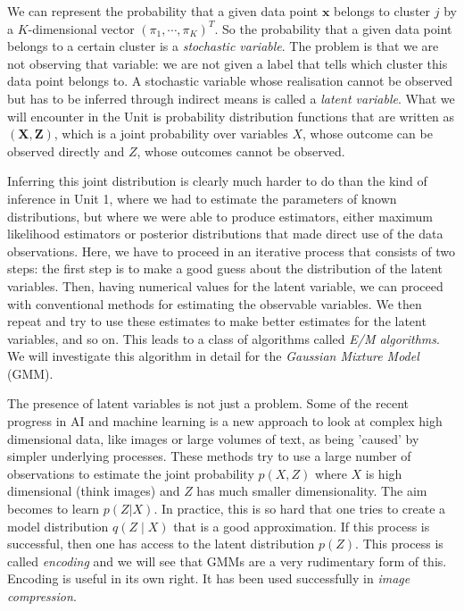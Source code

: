 We can represent the probability that a given data point $\boldsymbol{x}$ belongs to cluster $j$ by a $K$-dimensional
vector $(\pi_1, \cdots, \pi_K)^T$. So the probability that a given data point belongs to a certain cluster is a \emph{stochastic variable}.
The problem is that we are not observing that variable: we are not given a label that tells which cluster this data point belongs to. A stochastic
variable whose realisation cannot be observed but has to be inferred through indirect means is called a \emph{latent variable}. What
we will encounter in the Unit is probability distribution functions that are written as $(\boldsymbol{X}, \boldsymbol{Z})$, which
is a joint probability over variables $X$, whose outcome can be observed directly and $Z$, whose outcomes cannot be observed.

Inferring this joint distribution is clearly much harder to do than the kind of inference in Unit 1, where we had to estimate the parameters
of known distributions, but where we were able to produce estimators, either maximum likelihood estimators or posterior distributions
that made direct use of the data observations. Here, we have to proceed in an iterative process that consists of two steps:
the first step is to make a good guess about the distribution of the latent variables. Then, having numerical values for the latent variable, we
can proceed with conventional methods for estimating the observable variables. We then repeat and try to use these estimates
to make better estimates for the latent variables, and so on. This leads to a class of algorithms called \emph{E/M algorithms}. We will
investigate this algorithm in detail for the \emph{Gaussian Mixture Model} (GMM).

The presence of latent variables is not just a problem. Some of the recent progress in AI and machine learning is a new approach
to look at complex high dimensional data, like images or large volumes of text, as being 'caused' by simpler underlying
processes. These methods try to use a large number of observations to estimate the joint probability $p(X,Z)$ where
$X$ is high dimensional (think images) and $Z$ has much smaller dimensionality. The aim becomes to learn $p(Z | X)$. In practice, this is so hard
that one tries to create a model distribution $q(Z \mid X)$ that is a good approximation.  If this process is successful, then 
one has access to the latent distribution $p(Z)$. This process is called \emph{encoding} and we will see that GMMs are
a very rudimentary form of this. Encoding is useful in its own right. It has been used successfully in \emph{image compression}.

